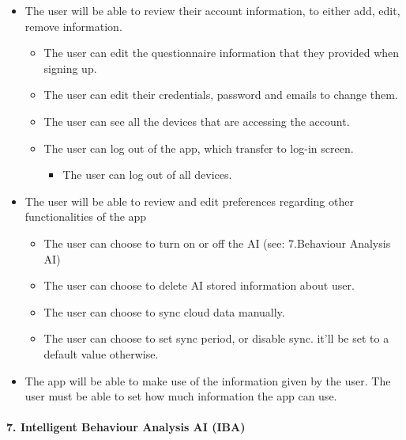 \documentclass[a4paper,11pt]{article} %
\begin{document}
\begin{itemize}
\item
  The user will be able to review their account information, to either
  add, edit, remove information.

  \begin{itemize}
  \item
    The user can edit the questionnaire information that they provided
    when signing up.
  \item
    The user can edit their credentials, password and emails to change
    them.
  \item
    The user can see all the devices that are accessing the account.
  \item
    The user can log out of the app, which transfer to log-in screen.

    \begin{itemize}
    \item
      The user can log out of all devices.
    \end{itemize}
  \end{itemize}
\item
  The user will be able to review and edit preferences regarding other
  functionalities of the app

  \begin{itemize}
  \item
    The user can choose to turn on or off the AI (see: 7.Behaviour
    Analysis AI)
  \item
    The user can choose to delete AI stored information about user.
  \item
    The user can choose to sync cloud data manually.
  \item
    The user can choose to set sync period, or disable sync. it'll be
    set to a default value otherwise.
  \end{itemize}
\item
  The app will be able to make use of the information given by the user.
  The user must be able to set how much information the app can use.
\end{itemize}

\hypertarget{intelligent-behaviour-analysis-ai-iba}{%
\paragraph{7. Intelligent Behaviour Analysis AI
(IBA)}\label{intelligent-behaviour-analysis-ai-iba}}
\end{document}
